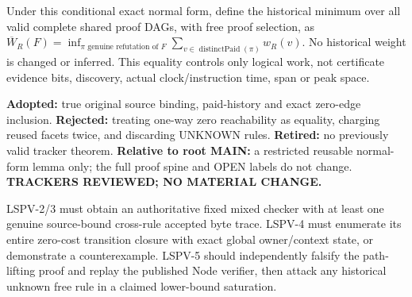 \documentclass[11pt]{article}
\begin{document}
Under this conditional exact normal form, define the historical minimum over all valid complete shared proof DAGs, with free proof selection, as $\overline W_R(F)=\inf_{\pi\text{ genuine refutation of }F}\sum_{v\in\operatorname{distinctPaid}(\pi)}w_R(v)$. No historical weight is changed or inferred. This equality controls only logical work, not certificate evidence bits, discovery, actual clock/instruction time, span or peak space.

\noindent\textbf{Adopted:} true original source binding, paid-history and exact zero-edge inclusion. \textbf{Rejected:} treating one-way zero reachability as equality, charging reused facets twice, and discarding UNKNOWN rules. \textbf{Retired:} no previously valid tracker theorem. \textbf{Relative to root MAIN:} a restricted reusable normal-form lemma only; the full proof spine and OPEN labels do not change. \textbf{TRACKERS REVIEWED; NO MATERIAL CHANGE.}

LSPV-2/3 must obtain an authoritative fixed mixed checker with at least one genuine source-bound cross-rule accepted byte trace. LSPV-4 must enumerate its entire zero-cost transition closure with exact global owner/context state, or demonstrate a counterexample. LSPV-5 should independently falsify the path-lifting proof and replay the published Node verifier, then attack any historical unknown free rule in a claimed lower-bound saturation.
\end{document}
